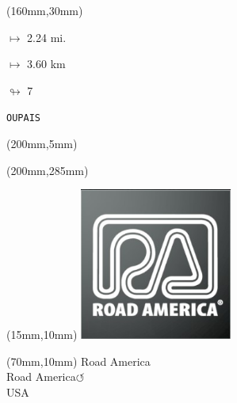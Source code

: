 \begin{textblock*}{40mm}(160mm,30mm)%
\Large
\par$\mapsto$ 2.24 mi.
\par$\mapsto$ 3.60 km
\par$\looparrowright$ 7
\par\hfill\tiny\tt OUPAIS\\
\end{textblock*}
\begin{textblock*}{20mm}(200mm,5mm)%
\fbox{\thepage}
\label{OUPAIS}
\end{textblock*}
\begin{textblock*}{20mm}(200mm,285mm)%
\fbox{\thepage}
\end{textblock*}

\null\newpage
\begin{textblock*}{50mm}(15mm,10mm)%
\includegraphics[width=50mm]{LG/2015-05-20_00092.png}
\end{textblock*}
\begin{textblock*}{130mm}(70mm,10mm)%
{\fontsize{20}{20}\selectfont Road America\\}
{\fontsize{16}{16}\selectfont Road America\hfill \huge$\circlearrowleft$\\}
{\fontsize{12}{12}\selectfont USA\\}
\end{textblock*}
